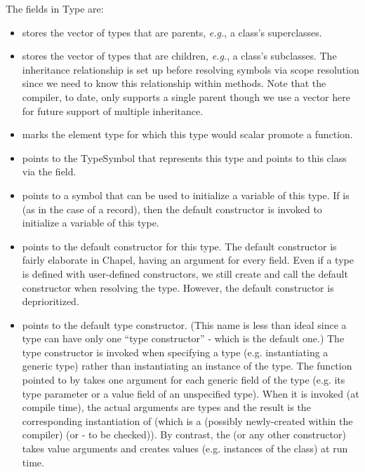 \documentclass[10pt]{article}
\newcommand{\eg}{\emph{e.g.}}
\begin{document}
The fields in Type are:
\begin{itemize}
\item {} stores the vector of types that
  are parents, \eg, a class's superclasses.
\item {} stores the vector of types that
  are children, \eg, a class's subclasses.  The inheritance
  relationship is set up before resolving symbols via scope resolution
  since we need to know this relationship within methods.  Note that
  the compiler, to date, only supports a single parent though we use a
  vector here for future support of multiple inheritance.
\item {} marks the element type for which
  this type would scalar promote a function.
\item {} points to the TypeSymbol that represents
  this type and points to this class via the  field.
\item {} points to a symbol that can be used to
  initialize a variable of this type.  If  is
   (as in the case of a record), then the default constructor
  is invoked to initialize a variable of this type.
\item {} points to the default
  constructor for this type.  The default constructor is fairly
  elaborate in Chapel, having an argument for every field.  Even if a
  type is defined with user-defined constructors, we still create and
  call the default constructor when resolving the type.  However, the
  default constructor is deprioritized.
\item {} points to the default type
  constructor.  (This name is less than ideal since a type can have
  only one ``type constructor'' - which is the default one.)  The type
  constructor is invoked when specifying a type (e.g. instantiating a
  generic type) rather than instantiating an instance of the type.
  The function pointed to by  takes one
  argument for each generic field of the type  (e.g. its type
  parameter or a value field of an unspecified type). When it is
  invoked (at compile time), the actual arguments are types and the
  result is the corresponding instantiation of  (which is a
  (possibly newly-created within the compiler)  (or
   - to be checked)). By contrast, the
   (or any other constructor) takes value
  arguments and creates values (e.g. instances of the class) at run
  time.


\end{itemize}
\end{document}
